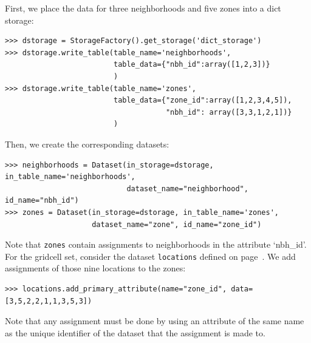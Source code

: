 First, we place the data for three neighborhoods and five zones into a dict storage:
\begin{verbatim}
>>> dstorage = StorageFactory().get_storage('dict_storage')
>>> dstorage.write_table(table_name='neighborhoods',
                         table_data={"nbh_id":array([1,2,3])}
                         )
>>> dstorage.write_table(table_name='zones',
                         table_data={"zone_id":array([1,2,3,4,5]),
                                     "nbh_id": array([3,3,1,2,1])}
                         )
\end{verbatim}

Then, we create the corresponding datasets: \datasetindex
\begin{verbatim}
>>> neighborhoods = Dataset(in_storage=dstorage, in_table_name='neighborhoods',
                            dataset_name="neighborhood", id_name="nbh_id")
>>> zones = Dataset(in_storage=dstorage, in_table_name='zones',
                    dataset_name="zone", id_name="zone_id")
\end{verbatim}
Note that \verb|zones| contain assignments to neighborhoods in the
attribute `nbh_id'.  For the gridcell set, consider the dataset \datasetindex
\verb|locations| defined on page~\pageref{page:tutorial-gc-locations}. We
add assignments of those nine locations to the zones:
\primaryattributesindex
\begin{verbatim}
>>> locations.add_primary_attribute(name="zone_id", data=[3,5,2,2,1,1,3,5,3])
\end{verbatim}
Note that any assignment must be done by using an attribute \attributesindex of the same name
as the unique identifier of the dataset \datasetindex that the assignment is made to.

